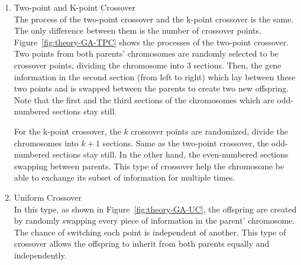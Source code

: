 \documentclass[12pt,oneside,openright,a4paper]{cpe-english-project}
\begin{document}
\begin{itemize}
\begin{enumerate}
		\begin{minipage}[c]{\textwidth}\centering
		\label{fig:theory-GA-SPC}
		\end{minipage}

		\item Two-point and K-point Crossover \\
		The process of the two-point crossover and the k-point crossover is the same. The only difference between them is the number of crossover points. Figure~\ref{fig:theory-GA-TPC} shows the processes of the two-point crossover. Two points from both parents' chromosomes are randomly selected to be crossover points, dividing the chromosome into 3 sections. Then, the gene information in the second section (from left to right) which lay between these two points and is swapped between the parents to create two new offspring. Note that the first and the third sections of the chromosomes which are odd-numbered sections stay still.

		\begin{minipage}[c]{\textwidth}\centering
		\label{fig:theory-GA-TPC}
		\end{minipage}

		For the k-point crossover, the $k$ crossover points are randomized, divide the chromosomes into $k+1$ sections. Same as the two-point crossover, the odd-numbered sections stay still. In the other hand, the even-numbered sections swapping between parents. This type of crossover help the chromosome be able to exchange its subset of information for multiple times.

		\item Uniform Crossover \\
		In this type, as shown in Figure~\ref{fig:theory-GA-UC}, the offspring are created by randomly swapping every piece of information in the parent' chromosome. The chance of switching each point is independent of another. This type of crossover allows the offspring to inherit from both parents equally and independently.


\end{enumerate}
\end{itemize}
\end{document}
